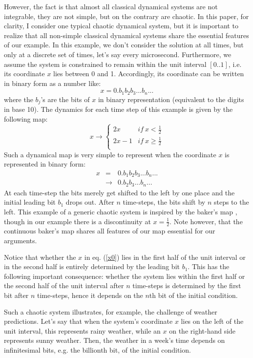 \documentclass[floatfix,12pt]{article}
\newcommand{\beq}{\begin{equation}}
\newcommand{\eeq}{\end{equation}}
\newcommand{\beqa}{\begin{eqnarray}}
\newcommand{\eeqa}{\end{eqnarray}}
\def\half{\frac{1}{2}}
\begin{document}
However, the fact is that almost all classical dynamical systems are not integrable, they are not simple, but on the contrary are chaotic. In this paper, for clarity, I consider one typical chaotic dynamical system, but it is important to realize that all non-simple classical dynamical systems share the essential features of our example. In this example, we don't consider the solution at all times, but only at a discrete set of times, let's say every microsecond. Furthermore, we assume the system is constrained to remain within the unit interval $[0..1]$, i.e. its coordinate $x$ lies between 0 and 1. Accordingly, its coordinate can be written in binary form as a number like:
\beq\label{x0}
x=0.b_1b_2b_3...b_n...
\eeq
where the $b_j$'s are the bits of $x$ in binary representation (equivalent to the digits in base 10). The dynamics for each time step of this example is given by the following map:
\beq
x\rightarrow\left\{
\begin{array}{ll}
2x & if\ x<\half \\%
2x-1 & if\ x\ge\half \\
\end{array}\right.
\eeq
Such a dynamical map is very simple to represent when the coordinate $x$ is represented in binary form:
\beqa\label{map}
x&=&0.b_1b_2b_3...b_n... \nonumber\\
&\rightarrow& 0.b_2b_3...b_n...
\eeqa
At each time-step the bits merely get shifted to the left by one place and the initial leading bit $b_1$ drops out. After $n$ time-steps, the bits shift by $n$ steps to the left. This example of a generic chaotic system is inspired by the baker's map \cite{baker}, though in our example there is a discontinuity at $x=\half$. Note however, that the continuous baker's map shares all features of our map essential for our arguments.

Notice that whether the $x$ in eq. (\ref{x0}) lies in the first half of the unit interval or in the second half is entirely determined by the leading bit $b_1$. This has the following important consequence: whether the system lies within the first half or the second half of the unit interval after $n$ time-steps is determined by the first bit after $n$ time-steps, hence it depends on the $n$th bit of the initial condition.

Such a chaotic system illustrates, for example, the challenge of weather predictions. Let's say that when the system's coordinate $x$ lies on the left of the unit interval, this represents rainy weather, while an $x$ on the right-hand side represents sunny weather. Then, the weather in a week's time depends on infinitesimal bits, e.g. the billionth bit, of the initial condition.
\end{document}
